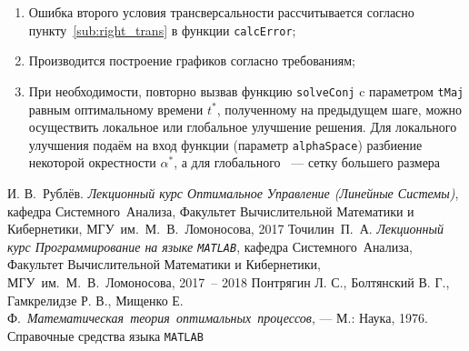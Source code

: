 \documentclass[11pt, oneside, final]{article}
\theoremstyle{break}
\numberwithin{equation}{section}
\theoremstyle{plain}
\theoremstyle{definition}
\begin{document}
\begin{enumerate}
        \item Ошибка второго условия трансверсальности рассчитывается согласно пункту~\ref{sub:right_trans} в функции \texttt{calcError};
        \item Производится построение графиков согласно требованиям;
        \item При необходимости, повторно вызвав функцию \texttt{solveConj} c параметром \texttt{tMaj} равным оптимальному времени \(t^*\), полученному на предыдущем шаге, можно осуществить локальное или глобальное улучшение решения. Для локального улучшения подаём на вход функции (параметр \texttt{alphaSpace}) разбиение некоторой окрестности \(\alpha^*\), а для глобального ~--- сетку большего размера
    \end{enumerate}
    \pagebreak
    \begin{thebibliography}{0}
         И. В.~Рублёв. \emph{Лекционный курс Оптимальное Управление (Линейные Системы)},
        кафедра Системного~Анализа, Факультет Вычислительной Математики и Кибернетики, МГУ~им.~М.~В.~Ломоносова, 
        2017
         Точилин~П.~А. \emph{Лекционный курс Программирование на языке \texttt{MATLAB}},
        кафедра Системного~Анализа, Факультет Вычислительной Математики и Кибернетики, МГУ~им.~М.~В.~Ломоносова, 
        2017~-- 2018
         Понтрягин Л. С., Болтянский В. Г., Гамкрелидзе Р. В., Мищенко Е. Ф.~\emph{Математическая~теория~оптимальных~процессов}, — М.: Наука, 1976.
         Справочные средства языка \texttt{MATLAB}
    \end{thebibliography}
\end{document}
